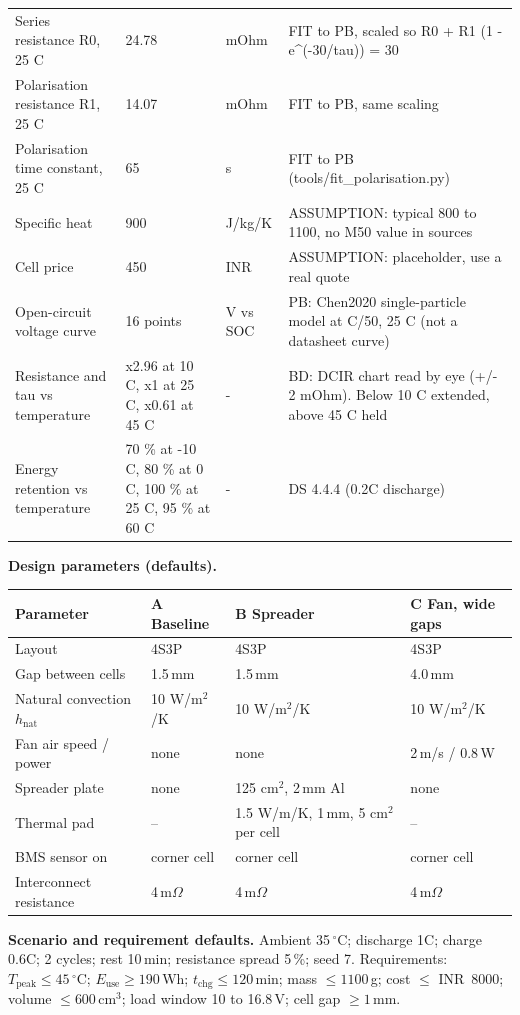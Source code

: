 \documentclass[11pt,a4paper]{article}
\newcommand{\degC}{\ensuremath{{}^{\circ}\mathrm{C}}}
\begin{document}
\begin{longtable}{@{}p{4.3cm}p{2.7cm}p{1.6cm}p{6.2cm}@{}}
Series resistance R0, 25 C & 24.78 & mOhm & FIT to PB, scaled so R0 + R1 (1 - e\^{}(-30/tau)) = 30 \\
Polarisation resistance R1, 25 C & 14.07 & mOhm & FIT to PB, same scaling \\
Polarisation time constant, 25 C & 65 & s & FIT to PB (tools/fit\_polarisation.py) \\
Specific heat & 900 & J/kg/K & ASSUMPTION: typical 800 to 1100, no M50 value in sources \\
Cell price & 450 & INR & ASSUMPTION: placeholder, use a real quote \\
Open-circuit voltage curve & 16 points & V vs SOC & PB: Chen2020 single-particle model at C/50, 25 C (not a datasheet curve) \\
Resistance and tau vs temperature & x2.96 at 10 C, x1 at 25 C, x0.61 at 45 C & - & BD: DCIR chart read by eye (+/- 2 mOhm). Below 10 C extended, above 45 C held \\
Energy retention vs temperature & 70 \% at -10 C, 80 \% at 0 C, 100 \% at 25 C, 95 \% at 60 C & - & DS 4.4.4 (0.2C discharge) \\
\bottomrule
\end{longtable}

\textbf{Design parameters (defaults).}
\begin{longtable}{@{}p{4.7cm}p{3.2cm}p{3.2cm}p{3.2cm}@{}}
\toprule
Parameter & A Baseline & B Spreader & C Fan, wide gaps \\
\midrule
\endhead
Layout & 4S3P & 4S3P & 4S3P \\
Gap between cells & 1.5\,mm & 1.5\,mm & 4.0\,mm \\
Natural convection $h_{\mathrm{nat}}$ & 10 W/m$^2$/K & 10 W/m$^2$/K & 10 W/m$^2$/K \\
Fan air speed / power & none & none & 2\,m/s / 0.8\,W \\
Spreader plate & none & 125 cm$^2$, 2\,mm Al & none \\
Thermal pad & -- & 1.5 W/m/K, 1\,mm, 5 cm$^2$ per cell & -- \\
BMS sensor on & corner cell & corner cell & corner cell \\
Interconnect resistance & 4\,m$\Omega$ & 4\,m$\Omega$ & 4\,m$\Omega$ \\
\bottomrule
\end{longtable}

\textbf{Scenario and requirement defaults.} Ambient 35\,\degC; discharge 1C; charge 0.6C; 2 cycles; rest 10\,min; resistance spread 5\,\%; seed 7. Requirements: $T_{\mathrm{peak}}\le45$\,\degC; $E_{\mathrm{use}}\ge190$\,Wh; $t_{\mathrm{chg}}\le120$\,min; mass $\le1100$\,g; cost $\le$ INR~8000; volume $\le600$\,cm$^3$; load window 10 to 16.8\,V; cell gap $\ge1$\,mm.
\end{document}
